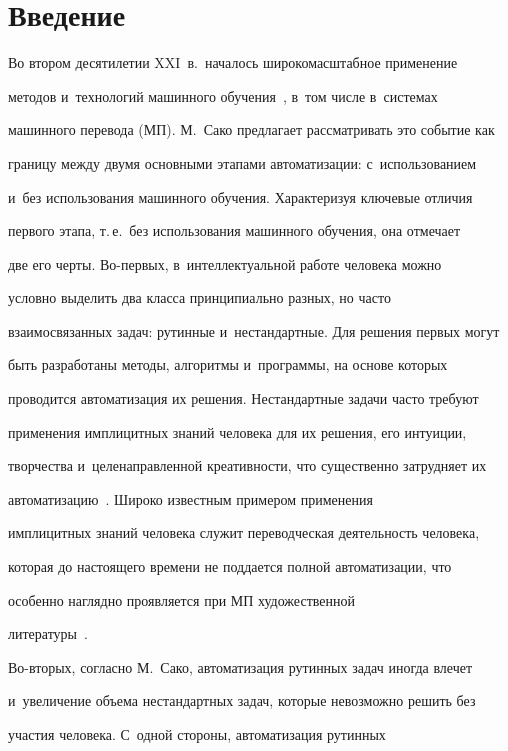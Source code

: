 \section{Введение}





  Во втором десятилетии XXI~в.\ началось широкомасштабное применение 


методов и~технологий машинного обучения~\cite{1-eg}, в~том числе в~системах 


машинного перевода (МП). М.~Сако предлагает рассматривать это событие как 


границу между двумя основными этапами автоматизации: с~использованием 


и~без использования машинного обучения. Характеризуя ключевые отличия 


первого этапа, т.\,е.\ без использования машинного обучения, она отмечает 


две его черты. Во-пер\-вых, в~интеллектуальной работе человека можно 


условно выделить два класса принципиально разных, но часто 


взаимосвязанных задач: рутинные и~нестандартные. Для решения первых могут 


быть разработаны методы, алгоритмы и~программы, на основе которых 


проводится автоматизация их решения. Нестандартные задачи часто требуют 


применения имплицитных знаний человека для их решения, его интуиции, 


творчества и~целенаправленной креативности, что существенно затрудняет их 


автоматизацию~\cite[с.~26]{2-eg}. Широко известным примером применения 


имплицитных знаний человека служит переводческая деятельность человека, 


которая до настоящего времени не поддается полной автоматизации, что 


особенно наглядно проявляется при МП художественной 


литературы~\cite{3-eg}.


  


  Во-вторых, согласно М.~Сако, автоматизация рутинных задач иногда влечет 


  и~увеличение объема нестандартных задач, которые невозможно решить без 


участия человека. С~одной стороны, автоматизация рутинных 


